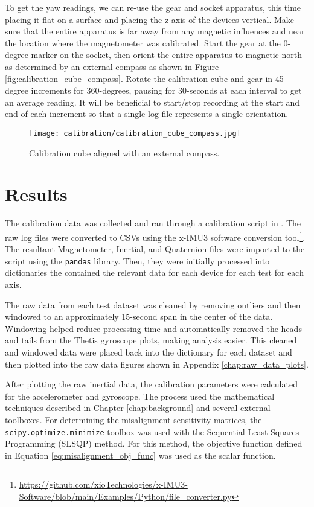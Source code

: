To get the yaw readings, we can re-use the gear and socket apparatus, this time placing it flat on a surface and placing the z-axis of the devices vertical.
Make sure that the entire apparatus is far away from any magnetic influences and near the location where the magnetometer was calibrated.
Start the gear at the 0-degree marker on the socket, then orient the entire apparatus to magnetic north as determined by an external compass as shown in Figure \ref{fig:calibration_cube_compass}.
Rotate the calibration cube and gear in 45-degree increments for 360-degrees, pausing for 30-seconds at each interval to get an average reading.
It will be beneficial to start/stop recording at the start and end of each increment so that a single log file represents a single orientation.

\begin{figure}[h!]
    \centering
    \texttt{[image: calibration/calibration\_cube\_compass.jpg]}
    \caption{Calibration cube aligned with an external compass.}
\end{figure}

\section{Results} 
The calibration data was collected and ran through a calibration script in \cite{Thetis-Scripts}.
The raw log files were converted to CSVs using the x-IMU3 software conversion tool\footnote{\url{https://github.com/xioTechnologies/x-IMU3-Software/blob/main/Examples/Python/file_converter.py}}.
The resultant Magnetometer, Inertial, and Quaternion files were imported to the script using the \lstinline[style=customInline]|pandas| library.
Then, they were initially processed into dictionaries the contained the relevant data for each device for each test for each axis.

The raw data from each test dataset was cleaned by removing outliers and then windowed to an approximately 15-second span in the center of the data.
Windowing helped reduce processing time and automatically removed the heads and tails from the Thetis gyroscope plots, making analysis easier.
This cleaned and windowed data were placed back into the dictionary for each dataset and then plotted into the raw data figures shown in Appendix \ref{chap:raw_data_plots}.

After plotting the raw inertial data, the calibration parameters were calculated for the accelerometer and gyroscope.
The process used the mathematical techniques described in Chapter \ref{chap:background} and several external toolboxes.
For determining the misalignment sensitivity matrices, the \lstinline[style=customInline]|scipy.optimize.minimize| toolbox was used with the Sequential Least Squares Programming (SLSQP) method.
For this method, the objective function defined in Equation \ref{eq:misalignment_obj_func} was used as the scalar function.


